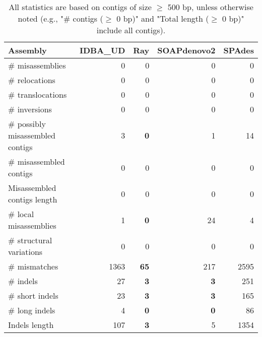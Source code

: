 \documentclass[12pt,a4paper]{article}
\begin{document}
\begin{table}[ht]
\begin{center}
\caption{All statistics are based on contigs of size $\geq$ 500 bp, unless otherwise noted (e.g., "\# contigs ($\geq$ 0 bp)" and "Total length ($\geq$ 0 bp)" include all contigs).}
\begin{tabular}{|l*{4}{|r}|}
\hline
Assembly & IDBA\_UD & Ray & SOAPdenovo2 & SPAdes \\ \hline
\# misassemblies & 0 & 0 & 0 & 0 \\ \hline
\hspace{5mm}\# relocations & 0 & 0 & 0 & 0 \\ \hline
\hspace{5mm}\# translocations & 0 & 0 & 0 & 0 \\ \hline
\hspace{5mm}\# inversions & 0 & 0 & 0 & 0 \\ \hline
\# possibly misassembled contigs & 3 & {\bf 0} & 1 & 14 \\ \hline
\# misassembled contigs & 0 & 0 & 0 & 0 \\ \hline
Misassembled contigs length & 0 & 0 & 0 & 0 \\ \hline
\# local misassemblies & 1 & {\bf 0} & 24 & 4 \\ \hline
\# structural variations & 0 & 0 & 0 & 0 \\ \hline
\# mismatches & 1363 & {\bf 65} & 217 & 2595 \\ \hline
\# indels & 27 & {\bf 3} & {\bf 3} & 251 \\ \hline
\hspace{5mm}\# short indels & 23 & {\bf 3} & {\bf 3} & 165 \\ \hline
\hspace{5mm}\# long indels & 4 & {\bf 0} & {\bf 0} & 86 \\ \hline
Indels length & 107 & {\bf 3} & 5 & 1354 \\ \hline
\end{tabular}
\end{center}
\end{table}
\end{document}
